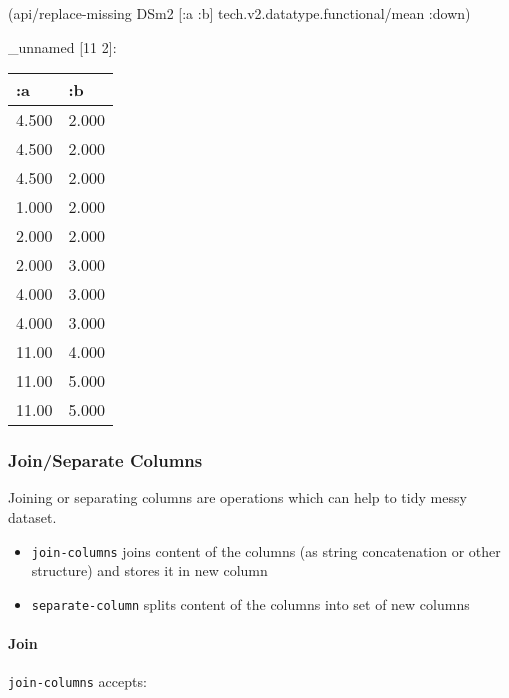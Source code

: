 \documentclass[]{article}
\newenvironment{Shaded}{\begin{snugshade}}{\end{snugshade}}
\newcommand{\AttributeTok}[1]{\textcolor[rgb]{0.77,0.63,0.00}{#1}}
\newcommand{\NormalTok}[1]{#1}
\providecommand{\tightlist}{%
  \setlength{\itemsep}{0pt}\setlength{\parskip}{0pt}}
\let\oldparagraph\paragraph
\renewcommand{\paragraph}[1]{\oldparagraph{#1}\mbox{}}
\begin{document}
\begin{Shaded}
\begin{Highlighting}[]
\NormalTok{(api/replace-missing DSm2 [}\AttributeTok{:a} \AttributeTok{:b}\NormalTok{] tech.v2.datatype.functional/mean }\AttributeTok{:down}\NormalTok{)}
\end{Highlighting}
\end{Shaded}

\_unnamed {[}11 2{]}:

\begin{longtable}[]{@{}ll@{}}
\toprule
:a & :b\tabularnewline
\midrule
\endhead
4.500 & 2.000\tabularnewline
4.500 & 2.000\tabularnewline
4.500 & 2.000\tabularnewline
1.000 & 2.000\tabularnewline
2.000 & 2.000\tabularnewline
2.000 & 3.000\tabularnewline
4.000 & 3.000\tabularnewline
4.000 & 3.000\tabularnewline
11.00 & 4.000\tabularnewline
11.00 & 5.000\tabularnewline
11.00 & 5.000\tabularnewline
\bottomrule
\end{longtable}

\subsubsection{Join/Separate Columns}\label{joinseparate-columns}

Joining or separating columns are operations which can help to tidy
messy dataset.

\begin{itemize}
\tightlist
\item
  \texttt{join-columns} joins content of the columns (as string
  concatenation or other structure) and stores it in new column
\item
  \texttt{separate-column} splits content of the columns into set of new
  columns
\end{itemize}

\paragraph{Join}\label{join}

\texttt{join-columns} accepts:
\end{document}
